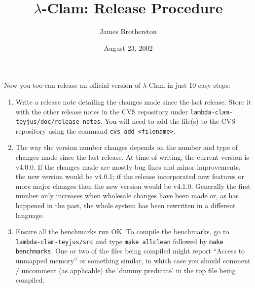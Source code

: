 \documentclass[11pt]{article}
\begin{document}
\title{$\lambda$-Clam: Release Procedure} 

\author{James Brotherston}

\date{August 23, 2002}

\maketitle

\noindent Now you too can release an official version of $\lambda$-Clam in just
10 easy steps:

\begin{enumerate}
\item Write a release note detailing the changes made since the last
  release.  Store it with the other release notes in the CVS
  repository under {\tt lambda-clam-teyjus/doc/release\_notes}.  You
  will need to add the file(s) to the CVS repository using the command
  {\tt cvs add <filename>}.
\item The way the version number changes depends on the number and
  type of changes made since the last release.  At time of writing,
  the current version is v4.0.0.  If the changes made are mostly bug
  fixes and minor improvements, the new version would be v4.0.1; if
  the release incorporated new features or more major changes then the
  new version would be v4.1.0.  Generally the first number only
  increases when wholesale changes have been made or, as has happened
  in the past, the whole system has been rewritten in a different language.
\item Ensure all the benchmarks run OK.  To compile the benchmarks, go
  to {\tt lambda-clam-teyjus/src} and type {\tt make allclean}
  followed by {\tt make benchmarks}.  One or two of the files being
  compiled might report ``Access to unmapped memory'' or something
  similar, in which case you should comment / uncomment (as
  applicable) the `dummy predicate' in the top file being compiled.
  

\end{enumerate}
\end{document}
